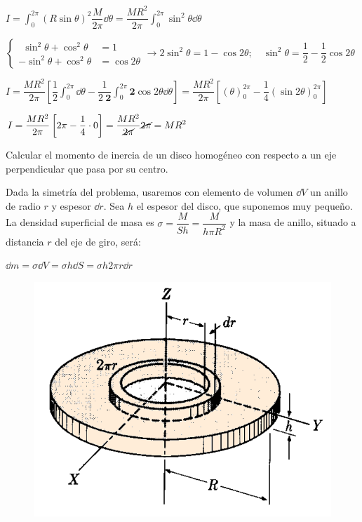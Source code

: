 $\displaystyle I=\int_0^{2\pi} (R\sin \theta)^2 \dfrac {M}{2\pi} \dd \theta
= \dfrac{MR^2}{2\pi} \int_0^{2\pi} \sin^2 \theta \dd \theta$

\small{$\begin{cases} \ \ \sin^2 \theta+\cos^2\theta &=1 \\ -\sin^2\theta+\cos^2\theta &=\cos 2\theta \end{cases} \to 2\sin^2\theta=1-\cos 2\theta;\quad \sin^2\theta=\dfrac 1 2 -\dfrac 1 2 \cos 2 \theta$}

\normalsize{$\displaystyle I=\dfrac{MR^2}{2\pi} \left[ \dfrac 1 2 \int_0^{2\pi} \dd \theta - \dfrac 1 {2\ \boldsymbol{2}}\int_0^{2\pi}\boldsymbol{2}\cos 2\theta \dd \theta \right] $}$=\displaystyle \dfrac{MR^2}{2\pi} \left[ \left(\theta \right)_0^{2\pi}-\dfrac 1 4 \left( \sin 2\theta \right)_0^{2\pi} \right] $

$\displaystyle I=\dfrac{MR^2}{2\pi} \left[ 2\pi-\dfrac 1 4 \cdot 0 \right]=
\dfrac{MR^2}{\cancel{2\pi}} \cancel{2\pi}=MR^2$

\vspace{10mm} %
\begin{prob}
Calcular el momento de inercia de un disco homogéneo con respecto a un eje perpendicular que pasa por su centro.	
\end{prob}

\vspace{10mm} %
\begin{multicols}{2}
Dada la simetría del problema, usaremos con elemento de volumen $\dd V$ un anillo de radio $r$ y espesor $\dd r$. Sea $h$ el espesor del disco, que suponemos muy pequeño. La densidad superficial de masa es $\sigma=\dfrac M{Sh}=\dfrac{M}{h\pi R^2}$ y la masa de anillo, situado a distancia $r$ del eje de giro, será:

$\dd m =\sigma \dd V = \sigma h \dd S= \sigma h 2\pi r \dd r$
\begin{figure}[H]
	\centering
	\includegraphics[width=.4\textwidth]{imagenes/imagenes16/T16IM10.png}
\end{figure}
\end{multicols}

